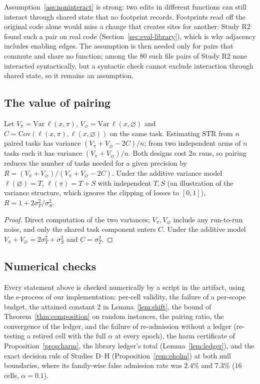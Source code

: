 Assumption~\ref{ass:noninteract} is strong: two edits in different functions can still interact through shared state that no
footprint records.  Footprints read off the original code alone would miss a change that creates sites for another: Study R2 found
such a pair on real code (Section~\ref{sec:eval-library}), which is why adjacency includes enabling edges.  The assumption is then
needed only for pairs that commute and share no function; among the $80$ such file pairs of Study R2 none
interacted syntactically, but a syntactic check cannot exclude interaction through shared state, so it remains an assumption.

\subsection{The value of pairing}

\begin{proposition}[Pairing]\label{prop:pairing}
Let $V_\pi=\mathrm{Var}\,\ell(x,\pi)$, $V_\varnothing=\mathrm{Var}\,\ell(x,\varnothing)$ and
$C=\mathrm{Cov}(\ell(x,\pi),\ell(x,\varnothing))$ on the same task.  Estimating $\mathrm{STR}$ from $n$ paired tasks has
variance $(V_\pi+V_\varnothing-2C)/n$; from two independent arms of $n$ tasks each it has variance $(V_\pi+V_\varnothing)/n$.
Both designs cost $2n$ runs, so pairing reduces the number of tasks needed for a given precision by
$R=(V_\pi+V_\varnothing)/(V_\pi+V_\varnothing-2C)$.  Under the additive variance model $\ell(\varnothing)=T$, $\ell(\pi)=T+S$ with
independent $T,S$ (an illustration of the variance structure, which ignores the clipping of losses to $[0,1]$),
$R=1+2\sigma_T^2/\sigma_S^2$.
\end{proposition}

\begin{proof}
Direct computation of the two variances; $V_\pi,V_\varnothing$ include any run-to-run noise, and only the
shared task component enters $C$.  Under the additive model $V_\pi+V_\varnothing=2\sigma_T^2+\sigma_S^2$ and $C=\sigma_T^2$.
\end{proof}

\subsection{Numerical checks}
\label{sec:checks}
Every statement above is checked numerically by a script in the artifact, using the e-process of our implementation:
per-cell validity, the failure of a per-scope budget, the attained constant $2$ in Lemma~\ref{lem:shift}, the bound of
Theorem~\ref{thm:composition} on random instances, the pairing ratio, the convergence of the ledger, and the failure of
re-admission without a ledger (re-testing a retired cell with the full $\alpha$ at every epoch), the harm certificate of
Proposition~\ref{prop:harm}, the library ledger's total (Lemma~\ref{lem:ledger}), and the exact decision rule of Studies D--H (Proposition~\ref{rem:eholm}) at both null
boundaries, where its family-wise false admission rate was $2.4\%$ and $7.3\%$ ($16$ cells, $\alpha=0.1$).
